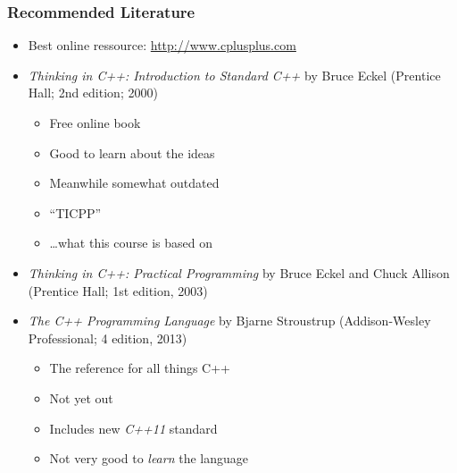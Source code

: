 \documentclass{slides}
\begin{document}
\begin{frame}
  \frametitle{Recommended Literature}
  \begin{itemize}
  \item Best online ressource: \url{http://www.cplusplus.com}
  \item \textit{Thinking in C++: Introduction to Standard C++} by
    Bruce Eckel (Prentice Hall; 2nd edition; 2000)
    \begin{itemize}
    \item Free online book
    \item Good to learn about the ideas
    \item Meanwhile somewhat outdated
    \item ``TICPP''
    \item \dots what this course is based on
    \end{itemize}
  \item \textit{Thinking in C++: Practical Programming} by Bruce Eckel
    and Chuck Allison (Prentice Hall; 1st edition, 2003)
  \item \textit{The C++ Programming Language} by Bjarne Stroustrup
    (Addison-Wesley Professional; 4 edition, 2013)
    \begin{itemize}
    \item The reference for all things C++
    \item Not yet out
    \item Includes new \textit{C++11} standard
    \item Not very good to \emph{learn} the language
    \end{itemize}
  \end{itemize}
\end{frame}
\end{document}
